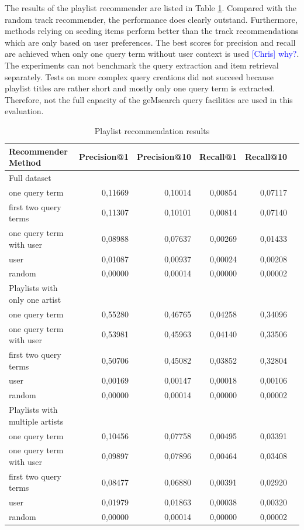 \documentclass[sigconf]{acmart}
\newcommand{\ce}[1]{\textcolor{blue}{[Chris] #1}}
\newcommand{\ce}[1]{}
\begin{document}
The results of the playlist recommender are listed in Table \ref{table:playlist_rec_results}. Compared with the random track recommender, the performance does clearly outstand. Furthermore, methods relying on seeding items perform better than the track recommendations which are only based on user preferences. The best scores for precision and recall are achieved when only one query term without user context is used \ce{why?}. The experiments can not benchmark the query extraction and item retrieval separately. Tests on more complex query creations did not succeed because playlist titles are rather short and mostly only one query term is extracted. Therefore, not the full capacity of the geMsearch query facilities are used in this evaluation.  \\


\begin{table}
	\caption{Playlist recommendation results}
	\label{table:playlist_rec_results}
	\begin{tabular}{lrrrrr}
		\midrule 
		\textbf{Recommender Method}& \textbf{Precision@1} & \textbf{Precision@10} & \textbf{Recall@1} & \textbf{Recall@10} \\ 
		
		\midrule 
		Full dataset \\
		\cmidrule{1-1}
		one query term  & 0,11669 & 0,10014 & 0,00854 & 0,07117 \\
		first two query terms & 0,11307 & 0,10101 & 0,00814 & 0,07140 \\
		one query term with user & 0,08988 & 0,07637 & 0,00269 & 0,01433  \\
		user & 0,01087 & 0,00937 & 0,00024 & 0,00208 \\
		random & 0,00000 & 0,00014 & 0,00000 & 0,00002 \\
		
		\midrule 
		Playlists with only one artist \\
		\cmidrule{1-1}
		one query term  & 0,55280 & 0,46765 & 0,04258 &	0,34096 \\
		one query term with user& 0,53981 & 0,45963 & 0,04140 & 0,33506 \\
		first two query terms & 0,50706 & 0,45082 & 0,03852 & 0,32804 \\
		user & 0,00169 & 0,00147 & 0,00018 & 0,00106 \\
		random & 0,00000 & 0,00014 & 0,00000 & 0,00002 \\ %
		
		\midrule 
		Playlists with multiple artists \\
		\cmidrule{1-1}
		one query term  & 0,10456 & 0,07758 & 0,00495 & 0,03391 \\
		one query term with user& 0,09897 & 0,07896 & 0,00464 & 0,03408 \\
		first two query terms & 0,08477 & 0,06880 & 0,00391 & 0,02920 \\
		user & 0,01979 &	0,01863 & 0,00038 & 0,00320 \\
		random & 0,00000 & 0,00014 & 0,00000 & 0,00002 \\ %
		
		\bottomrule
	\end{tabular}
\end{table}
\end{document}
